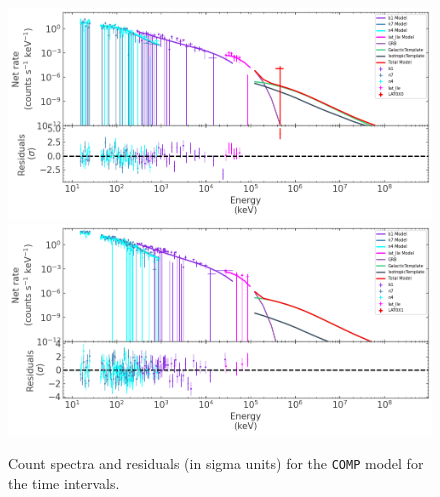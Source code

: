 \documentclass[preprint]{aastex631}
\begin{document}
\begin{figure}[t]
    \centering    
    \includegraphics[width=\linewidth]{precursor_interval_0.png}
    \includegraphics[width=\linewidth]{precursor_interval_1.png}
\caption{
Count spectra  and residuals (in sigma units) for the \texttt{COMP} model for the  time intervals.}
    \label{fig:prec_spectra}
\end{figure}

\end{document}
